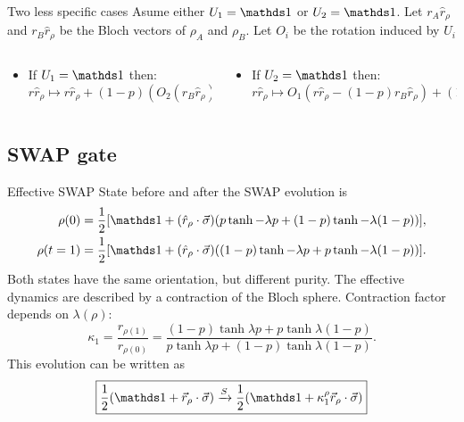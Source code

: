 \begin{frame}{Two less specific cases}
    Asume either $U_{1}=\Id$ or $U_{2}=\Id$.
    Let $r_{A}\hat{r}_{\rho}$ and $r_{B}\hat{r}_{\rho}$ be the Bloch vectors of $\rho_{A}$ and $\rho_{B}$. Let $O_{i}$ be the rotation induced by $U_{i}$
    \begin{columns}
        \begin{column}{0.5\textwidth}
            \begin{itemize}
                \item If $U_{1}=\Id$ then:
                \begin{equation*}
                    r\hat{r}_{\rho}\mapsto r\hat{r}_{\rho}+(1-p)(O_{2}(r_{B}\hat{r}_{\rho})-r_{B}\hat{r}_{\rho}).
                \end{equation*}
            \end{itemize}
        \end{column}
        \begin{column}{0.5\textwidth}
            \begin{itemize}
                \item If $U_{2}=\Id$ then:
                \begin{equation*}
                    r\hat{r}_{\rho}\mapsto O_{1}(r\hat{r}_{\rho}-(1-p)r_{B}\hat{r}_{\rho})+(1-p)r_{B}\hat{r}_{\rho}.
                \end{equation*}
            \end{itemize}
        \end{column}
    \end{columns}
\end{frame}


\subsection{SWAP gate}

\begin{frame}{Effective SWAP}
    State before and after the SWAP evolution is
    \begin{align*}
        \rho(0)&=\frac{1}{2}[\Id+(\hat{r}_{\rho}\cdot\vec{\sigma})(p\tanh{-\lambda p}+(1-p)\tanh{-\lambda (1-p)})],\\
        \rho(t=1)&=\frac{1}{2}[\Id+(\hat{r}_{\rho}\cdot\vec{\sigma})((1-p)\tanh{-\lambda p}+p\tanh{-\lambda (1-p)})].
        \end{align*}
    Both states have the same orientation, but different purity. The effective dynamics are described by a contraction of the Bloch sphere. Contraction factor depends on $\lambda(\rho)$:
    \begin{equation*}
        \kappa_{1}=\frac{r_{\rho(1)}}{r_{\rho(0)}}=\frac{(1-p)\tanh{\lambda p}+p\tanh{\lambda (1-p)}}{
          p\tanh{\lambda p}+(1-p)\tanh{\lambda (1-p)}}.
      \end{equation*}
      This evolution can be written as
      \begin{equation*}
        \boxed{\frac{1}{2}(\Id+\vec{r}_{\rho}\cdot\vec{\sigma}) \xrightarrow{S} \frac{1}{2}(\Id+\kappa_{1}^{\rho}\vec{r}_{\rho}\cdot\vec{\sigma})}
      \end{equation*}
\end{frame}

